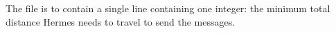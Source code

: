 The file is to contain a single line containing one integer: the minimum total distance Hermes needs to travel to send the messages. 